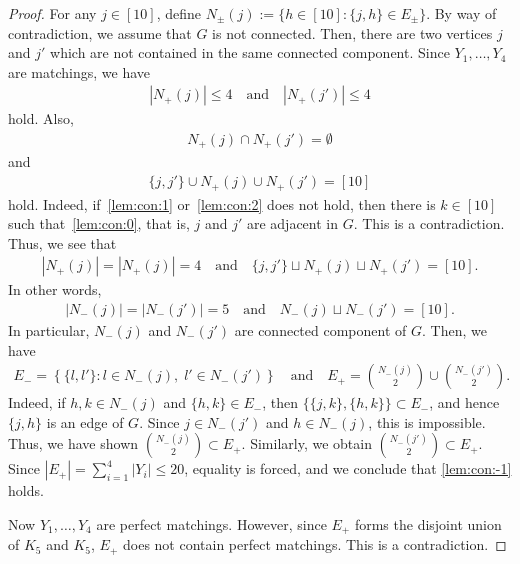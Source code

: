 \documentclass[reqno, 11pt]{amsart}
\numberwithin{equation}{section}
\theoremstyle{definition}
\begin{document}
\begin{proof}
	For any $j \in [10]$, define $N_{\pm}(j) := \{ h\in[10]:\{j,h\} \in E_{\pm}\}$.
	By way of contradiction, we assume that $G$ is not connected.
	Then, there are two vertices $j$ and $j'$ which are not contained in the same connected component.
	Since $Y_1, \ldots, Y_{4}$ are matchings, we have
	\begin{align*}
		|N_+(j)| \leq 4
		\quad \text{and} \quad
		|N_+(j')| \leq 4
	\end{align*}
	hold.
	Also,
	\begin{align}	\label{lem:con:1}
		N_+(j) \cap N_+(j') = \emptyset
	\end{align}
	and
	\begin{align}	\label{lem:con:2}
		\{j,j'\} \cup N_+(j) \cup N_+(j') = [10]
	\end{align}
	hold.
	Indeed, if~\eqref{lem:con:1} or~\eqref{lem:con:2} does not hold,
	then there is $k \in [10]$ such that~\eqref{lem:con:0}, that is, $j$ and $j'$ are adjacent in $G$.
	This is a contradiction.
	Thus, we see that
	\begin{align*}
		|N_+(j)| = |N_+(j)| = 4
		\quad \text{and} \quad
		\{j,j'\} \sqcup N_+(j) \sqcup N_+(j') = [10].
	\end{align*}
	In other words,
	\begin{align}
		|N_-(j)| = |N_-(j')| = 5
		\quad \text{and} \quad
		N_-(j) \sqcup N_-(j') = [10].
	\end{align}
	In particular, $N_-(j)$ and $N_-(j')$ are connected component of $G$.
	Then, we have
	\begin{align}	\label{lem:con:-1}
		E_- = \left\{\{ l, l' \} : l \in N_-(j),\; l' \in N_-(j') \right\}
		\quad \text{and} \quad
		E_+ = \binom{N_-(j)}{2} \cup  \binom{N_-(j')}{2}.
	\end{align}
	Indeed, if $h,k\in N_-(j)$ and $\{h,k\}\in E_-$, then
	$\{\{j,k\},\{h,k\}\}\subset E_-$, and hence $\{j,h\}$ is an edge of $G$.
	Since $j\in N_-(j')$ and $h\in N_-(j)$, this is impossible.
	Thus, we have shown $\binom{N_-(j)}{2}\subset E_+$.
	Similarly, we obtain $\binom{N_-(j')}{2}\subset E_+$. Since $|E_+|=\sum_{i=1}^4|Y_i|\leq20$,
	equality is forced, and we conclude that \eqref{lem:con:-1} holds.

	Now $Y_1, \ldots, Y_4$ are perfect matchings.
	However, since $E_+$ forms the disjoint union of $K_5$ and $K_5$,
	$E_+$ does not contain perfect matchings.
	This is a contradiction.
\end{proof}
\end{document}
